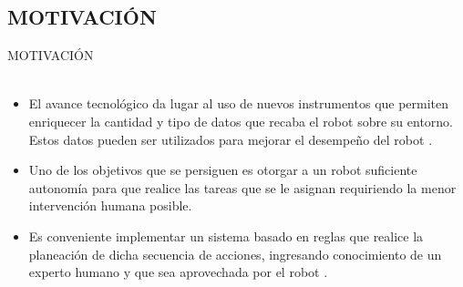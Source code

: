 \documentclass[handout,t]{beamer}
\begin{document}
    
    
\subsection{MOTIVACIÓN}
\begin{frame}{MOTIVACIÓN}
\phantom{sd}\\
\phantom{sd}\\
\begin{itemize}
    \item El avance tecnológico da lugar al uso de nuevos instrumentos que permiten enriquecer la cantidad y tipo de datos que recaba el robot sobre su entorno. Estos datos pueden ser utilizados para mejorar el desempeño del robot \cite{Kasaei2020}.
    \item Uno de los objetivos que se persiguen es otorgar a un robot suficiente autonomía para que realice las tareas que se le asignan requiriendo la menor intervención humana posible.
    \item Es conveniente implementar un sistema basado en reglas que realice la planeación de dicha secuencia de acciones, ingresando conocimiento de un experto humano y que sea aprovechada por el robot \cite{SAVAGE201977}.
 \end{itemize}
\end{frame}


\end{document}
